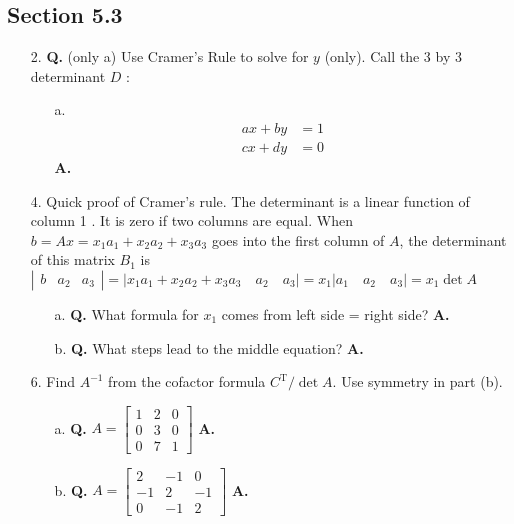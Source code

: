 \documentclass[main.tex]{subfiles}
\begin{document}
\subsection{Section 5.3}
\begin{enumerate}
    \item [2.] \textbf{Q.} (only a) Use Cramer's Rule to solve for $y$ (only). Call the 3 by 3 determinant $D$ :
    \begin{enumerate}
        \item [a.] 
            $$
            \begin{aligned}
            a x+b y &= 1\\
            c x+d y &=0
            \end{aligned}
            $$
            \textbf{A.}
    \end{enumerate}
    
    \item [4.] Quick proof of Cramer's rule. The determinant is a linear function of column 1 . It is zero if two columns are equal. When $b=A x=x_{1} a_{1}+x_{2} a_{2}+x_{3} a_{3}$ goes into the first column of $A$, the determinant of this matrix $B_{1}$ is $\left|\begin{array}{lll}b & a_{2} & a_{3}\end{array}\right|=\left|x_{1} a_{1}+x_{2} a_{2}+x_{3} a_{3} \quad a_{2} \quad a_{3}\right|=x_{1}\left|a_{1} \quad a_{2} \quad a_{3}\right|=x_{1} \operatorname{det} A$
    \begin{enumerate}
        \item [a.] \textbf{Q.} What formula for $x_{1}$ comes from left side = right side? \textbf{A.}
        \item [b.] \textbf{Q.} What steps lead to the middle equation? \textbf{A.}
    \end{enumerate}
    
    \item [6.] Find $A^{-1}$ from the cofactor formula $C^{\mathrm{T}} / \operatorname{det} A$. Use symmetry in part (b).
    \begin{enumerate}
        \item [a.] \textbf{Q.} $A=\left[\begin{array}{lll}1 & 2 & 0 \\ 0 & 3 & 0 \\ 0 & 7 & 1\end{array}\right]$ \textbf{A.}
        \item [b.] \textbf{Q.} $A=\left[\begin{array}{rrr}2 & -1 & 0 \\ -1 & 2 & -1 \\ 0 & -1 & 2\end{array}\right]$ \textbf{A.}
    \end{enumerate}
    

\end{enumerate}
\end{document}
